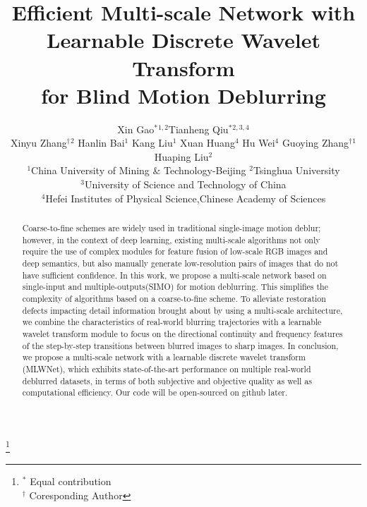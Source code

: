 \documentclass[10pt,twocolumn,letterpaper]{article}
\title{Efficient Multi-scale Network with Learnable Discrete Wavelet Transform \\ for Blind Motion Deblurring}
\author{Xin Gao$^{\ast}$$^{1,2}$\quad Tianheng Qiu$^{\ast}$$^{2,3,4}$\\
Xinyu Zhang$^{\dag}$$^{2}$ \;
Hanlin Bai$^{1}$ \;
Kang Liu$^{1}$ \; 
Xuan Huang$^{4}$ \; 
Hu Wei$^{4}$ \; 
Guoying Zhang$^{\dag}$$^{1}$ \; 
Huaping Liu$^{2}$ \\
$^{1}$China University of Mining \& Technology-Beijing \quad $^{2}$Tsinghua University \\
$^{3}$University of Science and Technology of China\\
$^{4}$Hefei Institutes of Physical Science,Chinese Academy of Sciences
\\
}
\begin{document}
\maketitle
\footnote{$^{\ast}$ Equal contribution\\$^{\dag}$ Coresponding Author}
\begin{abstract}
Coarse-to-fine schemes are widely used in traditional single-image motion deblur; however, in the context of deep learning, existing multi-scale algorithms not only require the use of complex modules for feature fusion of low-scale RGB images and deep semantics, but also manually generate low-resolution pairs of images that do not have sufficient confidence. In this work, we propose a multi-scale network based on single-input and multiple-outputs(SIMO) for motion deblurring. This simplifies the complexity of algorithms based on a coarse-to-fine scheme. To alleviate restoration defects impacting detail information brought about by using a multi-scale architecture, we combine the characteristics of real-world blurring trajectories with a learnable wavelet transform module to focus on the directional continuity and frequency features of the step-by-step transitions between blurred images to sharp images. In conclusion, we propose a multi-scale network with a learnable discrete wavelet transform (MLWNet), which exhibits state-of-the-art performance on multiple real-world deblurred datasets, in terms of both subjective and objective quality as well as computational efficiency. Our code will be open-sourced on github later.

\end{abstract}
\end{document}
